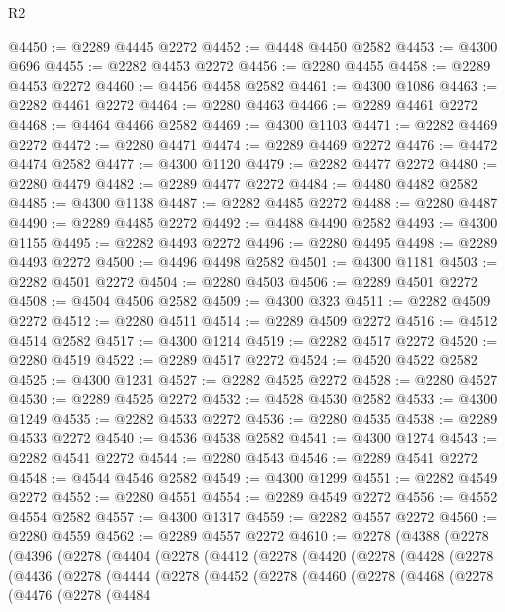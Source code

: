 \begin{lexlean}{R2}
\begin{coremodule}
@4450 := @2289 @4445 @2272
@4452 := @4448 @4450 @2582
@4453 := @4300 @696
@4455 := @2282 @4453 @2272
@4456 := @2280 @4455
@4458 := @2289 @4453 @2272
@4460 := @4456 @4458 @2582
@4461 := @4300 @1086
@4463 := @2282 @4461 @2272
@4464 := @2280 @4463
@4466 := @2289 @4461 @2272
@4468 := @4464 @4466 @2582
@4469 := @4300 @1103
@4471 := @2282 @4469 @2272
@4472 := @2280 @4471
@4474 := @2289 @4469 @2272
@4476 := @4472 @4474 @2582
@4477 := @4300 @1120
@4479 := @2282 @4477 @2272
@4480 := @2280 @4479
@4482 := @2289 @4477 @2272
@4484 := @4480 @4482 @2582
@4485 := @4300 @1138
@4487 := @2282 @4485 @2272
@4488 := @2280 @4487
@4490 := @2289 @4485 @2272
@4492 := @4488 @4490 @2582
@4493 := @4300 @1155
@4495 := @2282 @4493 @2272
@4496 := @2280 @4495
@4498 := @2289 @4493 @2272
@4500 := @4496 @4498 @2582
@4501 := @4300 @1181
@4503 := @2282 @4501 @2272
@4504 := @2280 @4503
@4506 := @2289 @4501 @2272
@4508 := @4504 @4506 @2582
@4509 := @4300 @323
@4511 := @2282 @4509 @2272
@4512 := @2280 @4511
@4514 := @2289 @4509 @2272
@4516 := @4512 @4514 @2582
@4517 := @4300 @1214
@4519 := @2282 @4517 @2272
@4520 := @2280 @4519
@4522 := @2289 @4517 @2272
@4524 := @4520 @4522 @2582
@4525 := @4300 @1231
@4527 := @2282 @4525 @2272
@4528 := @2280 @4527
@4530 := @2289 @4525 @2272
@4532 := @4528 @4530 @2582
@4533 := @4300 @1249
@4535 := @2282 @4533 @2272
@4536 := @2280 @4535
@4538 := @2289 @4533 @2272
@4540 := @4536 @4538 @2582
@4541 := @4300 @1274
@4543 := @2282 @4541 @2272
@4544 := @2280 @4543
@4546 := @2289 @4541 @2272
@4548 := @4544 @4546 @2582
@4549 := @4300 @1299
@4551 := @2282 @4549 @2272
@4552 := @2280 @4551
@4554 := @2289 @4549 @2272
@4556 := @4552 @4554 @2582
@4557 := @4300 @1317
@4559 := @2282 @4557 @2272
@4560 := @2280 @4559
@4562 := @2289 @4557 @2272
@4610 := @2278
    (@4388
      (@2278
        (@4396
          (@2278
            (@4404
              (@2278
                (@4412
                  (@2278
                    (@4420
                      (@2278
                        (@4428
                          (@2278
                            (@4436
                              (@2278
                                (@4444
                                  (@2278
                                    (@4452
                                      (@2278
                                        (@4460
                                          (@2278
                                            (@4468
                                              (@2278
                                                (@4476
                                                  (@2278
                                                    (@4484

\end{coremodule}
\end{lexlean}
